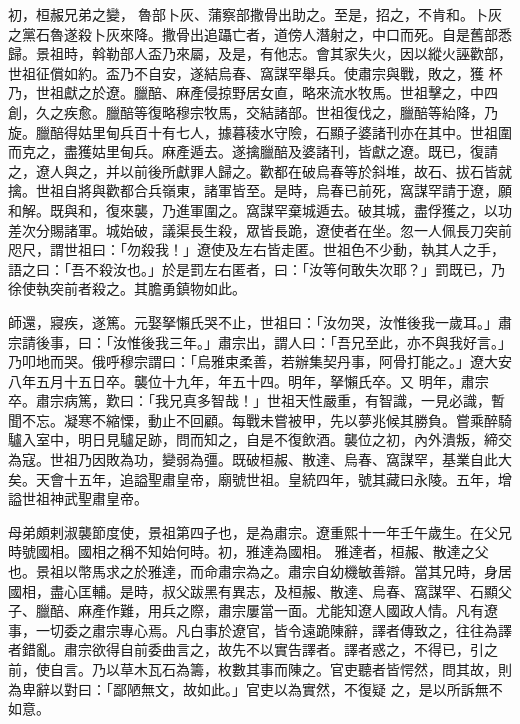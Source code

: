 \begin{pinyinscope}
 初，桓赧兄弟之變，魯部卜灰、蒲察部撒骨出助之。至是，招之，不肯和。卜灰之黨石魯遂殺卜灰來降。撒骨出追躡亡者，道傍人潛射之，中口而死。自是舊部悉歸。景祖時，斡勒部人盃乃來屬，及是，有他志。會其家失火，因以縱火誣歡部，世祖征償如約。盃乃不自安，遂結烏春、窩謀罕舉兵。使肅宗與戰，敗之，獲
 杯乃，世祖獻之於遼。臘醅、麻產侵掠野居女直，略來流水牧馬。世祖擊之，中四創，久之疾愈。臘醅等復略穆宗牧馬，交結諸部。世祖復伐之，臘醅等紿降，乃旋。臘醅得姑里甸兵百十有七人，據暮稜水守險，石顯子婆諸刊亦在其中。世祖圍而克之，盡獲姑里甸兵。麻產遁去。遂擒臘醅及婆諸刊，皆獻之遼。既已，復請之，遼人與之，并以前後所獻罪人歸之。歡都在破烏春等於斜堆，故石、拔石皆就擒。世祖自將與歡都合兵嶺東，諸軍皆至。是時，烏春已前死，窩謀罕請于遼，願和解。既與和，復來襲，乃進軍圍之。窩謀罕棄城遁去。破其城，盡俘獲之，以功
 差次分賜諸軍。城始破，議渠長生殺，眾皆長跪，遼使者在坐。忽一人佩長刀突前咫尺，謂世祖曰：「勿殺我！」遼使及左右皆走匿。世祖色不少動，執其人之手，語之曰：「吾不殺汝也。」於是罰左右匿者，曰：「汝等何敢失次耶？」罰既已，乃徐使執突前者殺之。其膽勇鎮物如此。



 師還，寢疾，遂篤。元娶拏懶氏哭不止，世祖曰：「汝勿哭，汝惟後我一歲耳。」肅宗請後事，曰：「汝惟後我三年。」肅宗出，謂人曰：「吾兄至此，亦不與我好言。」乃叩地而哭。俄呼穆宗謂曰：「烏雅束柔善，若辦集契丹事，阿骨打能之。」遼大安八年五月十五日卒。襲位十九年，年五十四。明年，拏懶氏卒。又
 明年，肅宗卒。肅宗病篤，歎曰：「我兄真多智哉！」世祖天性嚴重，有智識，一見必識，暫聞不忘。凝寒不縮慄，動止不回顧。每戰未嘗被甲，先以夢兆候其勝負。嘗乘醉騎驢入室中，明日見驢足跡，問而知之，自是不復飲酒。襲位之初，內外潰叛，締交為寇。世祖乃因敗為功，變弱為彊。既破桓赧、散達、烏春、窩謀罕，基業自此大矣。天會十五年，追謚聖肅皇帝，廟號世祖。皇統四年，號其藏曰永陵。五年，增謚世祖神武聖肅皇帝。



 母弟頗剌淑襲節度使，景祖第四子也，是為肅宗。遼重熙十一年壬午歲生。在父兄時號國相。國相之稱不知始何時。初，雅達為國相。
 雅達者，桓赧、散達之父也。景祖以幣馬求之於雅達，而命肅宗為之。肅宗自幼機敏善辯。當其兄時，身居國相，盡心匡輔。是時，叔父跋黑有異志，及桓赧、散達、烏春、窩謀罕、石顯父子、臘醅、麻產作難，用兵之際，肅宗屢當一面。尤能知遼人國政人情。凡有遼事，一切委之肅宗專心焉。凡白事於遼官，皆令遠跪陳辭，譯者傳致之，往往為譯者錯亂。肅宗欲得自前委曲言之，故先不以實告譯者。譯者惑之，不得已，引之前，使自言。乃以草木瓦石為籌，枚數其事而陳之。官吏聽者皆愕然，問其故，則為卑辭以對曰：「鄙陋無文，故如此。」官吏以為實然，不復疑
 之，是以所訴無不如意。




\end{pinyinscope}
